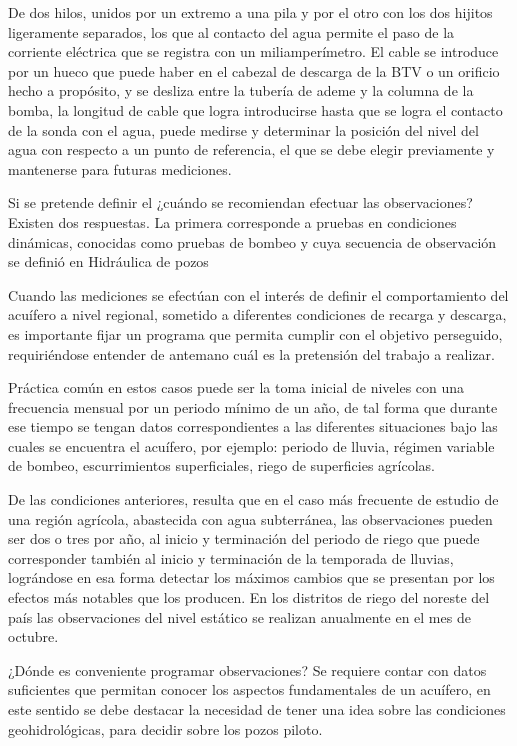 De dos hilos, unidos por un extremo a una pila y por el otro con los dos hijitos ligeramente separados, los que al contacto del agua permite el paso de la corriente eléctrica que se registra con un miliamperímetro. El cable se introduce por un hueco que puede haber en el cabezal de descarga de la BTV o un orificio hecho a propósito, y se desliza entre la tubería de ademe y la columna de la bomba, la longitud de cable que logra introducirse hasta que se logra el contacto de la sonda con el agua, puede medirse y determinar la posición del nivel del agua con respecto a un punto de referencia, el que se debe elegir previamente y mantenerse para futuras mediciones.

Si se pretende definir el ¿cuándo se recomiendan efectuar las observaciones? Existen dos respuestas. La primera corresponde a pruebas en condiciones dinámicas, conocidas como pruebas de bombeo y cuya secuencia de observación se definió en Hidráulica de pozos

Cuando las mediciones se efectúan con el interés de definir el comportamiento del acuífero a nivel regional, sometido a diferentes condiciones de recarga y descarga, es importante fijar un programa que permita cumplir con el objetivo perseguido, requiriéndose entender de antemano cuál es la pretensión del trabajo a realizar.

Práctica común en estos casos puede ser la toma inicial de niveles con una frecuencia mensual por un periodo mínimo de un año, de tal forma que durante ese tiempo se tengan datos correspondientes a las diferentes situaciones bajo las cuales se encuentra el acuífero, por ejemplo: periodo de lluvia, régimen variable de bombeo, escurrimientos superficiales, riego de superficies agrícolas.

De las condiciones anteriores, resulta que en el caso más frecuente de estudio de una región agrícola, abastecida con agua subterránea, las observaciones pueden ser dos o tres por año, al inicio y terminación del periodo de riego que puede corresponder también al inicio y terminación de la temporada de lluvias, lográndose en esa forma detectar los máximos cambios que se presentan por los efectos más notables que los producen. En los distritos de riego del noreste del país las observaciones del nivel estático se realizan anualmente en el mes de octubre.

¿Dónde es conveniente programar observaciones? Se requiere contar con datos suficientes que permitan conocer los aspectos fundamentales de un acuífero, en este sentido se debe destacar la necesidad de tener una idea sobre las condiciones geohidrológicas, para decidir sobre los pozos piloto.

